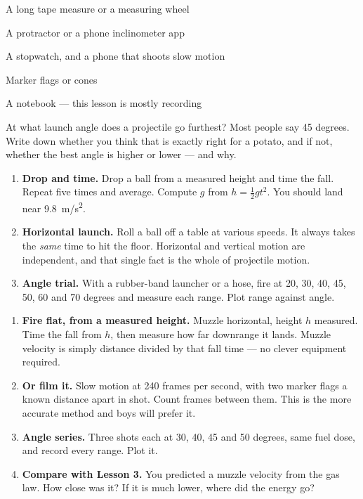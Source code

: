



\begin{materials}
\item A long tape measure or a measuring wheel
\item A protractor or a phone inclinometer app
\item A stopwatch, and a phone that shoots slow motion
\item Marker flags or cones
\item A notebook --- this lesson is mostly recording
\end{materials}

\begin{predict}
At what launch angle does a projectile go furthest? Most people say 45 degrees.
Write down whether you think that is exactly right for a potato, and if not,
whether the best angle is higher or lower --- and why.
\end{predict}

\begin{enumerate}
\item \textbf{Drop and time.} Drop a ball from a measured height and time the fall. Repeat five times and average. Compute $g$ from $h = \tfrac{1}{2}gt^2$. You should land near \qty{9.8}{m/s^2}.
\item \textbf{Horizontal launch.} Roll a ball off a table at various speeds. It always takes the \emph{same} time to hit the floor. Horizontal and vertical motion are independent, and that single fact is the whole of projectile motion.
\item \textbf{Angle trial.} With a rubber-band launcher or a hose, fire at 20, 30, 40, 45, 50, 60 and 70 degrees and measure each range. Plot range against angle.
\end{enumerate}

\begin{enumerate}
\item \textbf{Fire flat, from a measured height.} Muzzle horizontal, height $h$ measured. Time the fall from $h$, then measure how far downrange it lands. Muzzle velocity is simply distance divided by that fall time --- no clever equipment required.
\item \textbf{Or film it.} Slow motion at 240 frames per second, with two marker flags a known distance apart in shot. Count frames between them. This is the more accurate method and boys will prefer it.
\item \textbf{Angle series.} Three shots each at 30, 40, 45 and 50 degrees, same fuel dose, and record every range. Plot it.
\item \textbf{Compare with Lesson 3.} You predicted a muzzle velocity from the gas law. How close was it? If it is much lower, where did the energy go?
\end{enumerate}


